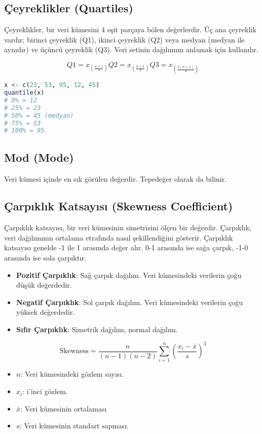 \subsection{Çeyreklikler (Quartiles)}
Çeyreklikler, bir veri kümesini 4 eşit parçaya bölen değerlerdir. Üç ana çeyreklik vardır; birinci çeyreklik (Q1), ikinci çeyreklik (Q2) veya medyan (medyan ile aynıdır) ve üçüncü çeyreklik (Q3). Veri setinin dağılımını anlamak için kullanılır.

\[
Q1 = x_{\left(\frac{n+1}{4}\right)}
Q2 = x_{\left(\frac{n+1}{2}\right)}
Q3 = x_{\left(\frac{3(n+1)}{4}\right)}
\]

\begin{lstlisting}[language=R]
x <- c(23, 53, 95, 12, 45)
quantile(x)
# 0% = 12
# 25% = 23
# 50% = 45 (medyan)
# 75% = 53
# 100% = 95
\end{lstlisting}

\subsection{Mod (Mode)}
Veri kümesi içinde en sık görülen değerdir. Tepedeğer olarak da bilinir.

\subsection{Çarpıklık Katsayısı (Skewness Coefficient)}
Çarpıklık katsayısı, bir veri kümesinin simetrisini ölçen bir değerdir. Çarpıklık, veri dağılımının ortalama etrafında nasıl şekillendiğini gösterir. Çarpıklık katsayısı genelde -1 ile 1 arasında değer alır. 0-1 arasında ise sağa çarpık, -1-0 arasında ise sola çarpıktır. 
\begin{itemize}
	\item \textbf{Pozitif Çarpıklık}: Sağ çarpık dağılım. Veri kümesindeki verilerin çoğu düşük değerdedir.
	\item \textbf{Negatif Çarpıklık}: Sol çarpık dağılım. Veri kümesindeki verilerin çoğu yüksek değerdedir.
	\item \textbf{Sıfır Çarpıklık}: Simetrik dağılım, normal dağılım.
\end{itemize}


\[
\text{Skewness} = \frac{n}{(n-1)(n-2)} \sum_{i=1}^{n} \left( \frac{x_i - \bar{x}}{s} \right)^3
\]

\begin{itemize}
	\item $n$: Veri kümesindeki gözlem sayısı.
	\item $x_i$: i'inci gözlem.
	\item $\bar{x}$: Veri kümesinin ortalaması
	\item $s$: Veri kümesinin standart sapması.
\end{itemize}

